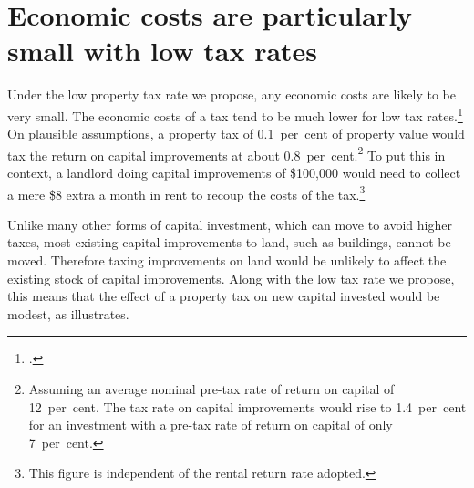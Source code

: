 \documentclass[twoside,english]{palatinob5portrait}
\begin{document}
\section{\label{sec:PROP-4-3}Economic costs are particularly small with low tax rates}
Under the low property tax rate we propose, any economic costs are likely to be very small. The economic costs of a tax tend to be much lower for low tax rates.\footcite[][18]{KPMGEconotech2011-GST}  On plausible assumptions, a property tax of 0.1~per~cent of property value would tax the return on capital improvements at about 0.8~per~cent.\footnote{Assuming an average nominal pre-tax rate of return on capital of 12~per~cent. The tax rate on capital improvements would rise to 1.4~per~cent for an investment with a pre-tax rate of return on capital of only 7~per~cent.}  To put this in context, a landlord doing capital improvements of \$100,000 would need to collect a mere \$8 extra a month in rent to recoup the costs of the tax.\footnote{This figure is independent of the rental return rate adopted.}

Unlike many other forms of capital investment, which can move to avoid higher taxes, most existing capital improvements to land, such as buildings, cannot be moved. Therefore taxing improvements on land would be unlikely to affect the existing stock of capital improvements. Along with the low tax rate we propose, this means that the effect of a property tax on new capital invested would be modest, as  illustrates.  
\end{document}
